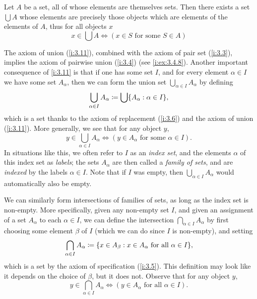 \begin{ax}[Union]\label{i:3.11}
  Let \(A\) be a set, all of whose elements are themselves sets.
  Then there exists a set \(\bigcup A\) whose elements are precisely those objects which are elements of the elements of \(A\), thus for all objects \(x\)
  \[
    x \in \bigcup A \iff (x \in S \text{ for some } S \in A)
  \]
\end{ax}

\begin{note}
  The axiom of union (\cref{i:3.11}), combined with the axiom of pair set (\cref{i:3.3}), implies the axiom of pairwise union (\cref{i:3.4}) (see \cref{i:ex:3.4.8}).
  Another important consequence of \cref{i:3.11} is that if one has some set \(I\), and for every element \(\alpha \in I\) we have some set \(A_\alpha\), then we can form the union set \(\bigcup_{\alpha \in I} A_\alpha\) by defining
  \[
    \bigcup_{\alpha \in I} A_\alpha \coloneqq \bigcup \set{A_\alpha : \alpha \in I},
  \]
  which is a set thanks to the axiom of replacement (\cref{i:3.6}) and the axiom of union (\cref{i:3.11}).
  More generally, we see that for any object \(y\),
  \[
    y \in \bigcup_{\alpha \in I} A_\alpha \iff (y \in A_\alpha \text{ for some } \alpha \in I).
  \]
  In situations like this, we often refer to \(I\) as an \emph{index set}, and the elements \(\alpha\) of this index set as \emph{labels};
  the sets \(A_\alpha\) are then called a \emph{family of sets}, and are \emph{indexed} by the labels \(\alpha \in I\).
  Note that if \(I\) was empty, then \(\bigcup_{\alpha \in I} A_\alpha\) would automatically also be empty.
\end{note}

\begin{note}
  We can similarly form intersections of families of sets, as long as the index set is non-empty.
  More specifically, given any non-empty set \(I\), and given an assignment of a set \(A_\alpha\) to each \(\alpha \in I\), we can define the intersection \(\bigcap_{\alpha \in I} A_\alpha\) by first choosing some element \(\beta\) of \(I\) (which we can do since \(I\) is non-empty), and setting
  \[
    \bigcap_{\alpha \in I} A_\alpha \coloneqq \set{x \in A_\beta : x \in A_\alpha \text{ for all } \alpha \in I},
  \]
  which is a set by the axiom of specification (\cref{i:3.5}).
  This definition may look like it depends on the choice of \(\beta\), but it does not.
  Observe that for any object \(y\),
  \[
    y \in \bigcap_{\alpha \in I} A_\alpha \iff (y \in A_\alpha \text{ for all } \alpha \in I).
  \]
\end{note}


